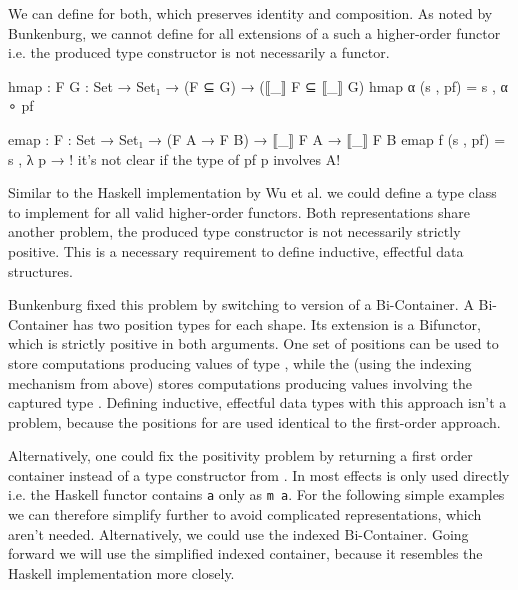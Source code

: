 We can define  for both, which preserves identity and
composition.
As noted by Bunkenburg, we cannot define  for all extensions
of a such a higher-order functor i.e. the produced type constructor is not
necessarily a functor.

\begin{code}
  hmap : {F G : Set → Set₁} → (F ⊆ G) → (⟦_⟧ F ⊆ ⟦_⟧ G)
  hmap α (s , pf) = s , α ∘ pf

  emap : {F : Set → Set₁} → (F A → F B) → ⟦_⟧ F A → ⟦_⟧ F B
  emap f (s , pf) = s , λ p → {! it's not clear if the type of pf p involves A!}
\end{code}
Similar to the Haskell implementation by Wu et al. we could define a type class
to implement  for all valid higher-order functors.
Both representations share another problem, the produced type constructor is not
necessarily strictly positive.
This is a necessary requirement to define inductive, effectful data structures.

Bunkenburg fixed this problem by switching to version of a Bi-Container.
A Bi-Container has two position types for each shape.
Its extension is a Bifunctor, which is strictly positive in both arguments.
One set of positions can be used to store computations producing values of type
, while the (using the indexing mechanism from above) stores
computations producing values involving the captured type .
Defining inductive, effectful data types with this approach isn't a problem,
because the positions for  are used identical to the first-order
approach.

Alternatively, one could fix the positivity problem by returning a first order
container instead of a type constructor from .
In most effects  is only used directly i.e. the Haskell functor
contains \texttt{a} only as \texttt{m a}.
For the following simple examples we can therefore simplify 
further to avoid complicated representations, which aren't needed.
Alternatively, we could use the indexed Bi-Container.
Going forward we will use the simplified indexed container, because it resembles
the Haskell implementation more closely.

